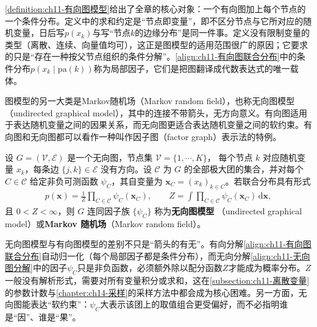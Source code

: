 \documentclass[../../main.tex]{subfiles}
\begin{document}
\begin{remark}
\cref{definition:ch11-有向图模型}给出了全章的核心对象：一个有向图加上每个节点的一个条件分布。定义中的求和约定是“节点即变量”，即不区分节点与它所对应的随机变量，日后写$p(x_k)$与写“节点$k$的边缘分布”是同一件事。定义没有限制变量的类型（离散、连续、向量值均可），这正是图模型的适用范围很广的原因；它要求的只是“存在一种按父节点组织的条件分解”。\eqref{align:ch11-有向图联合分布}中的条件分布$p(x_k\mid \mathrm{pa}(k))$称为局部因子，它们是把图翻译成代数表达式的唯一载体。
\end{remark}

图模型的另一大类是Markov随机场（Markov random field），也称无向图模型（undirected graphical model），其中的连接不带箭头，无方向意义。有向图适用于表达随机变量之间的因果关系，而无向图更适合表达随机变量之间的软约束。有向图和无向图都可以看作一种叫作因子图（factor graph）表示法的特例。

\begin{definition}[无向图模型]\label{definition:ch11-无向图模型}
设 $G=(\mathcal{V},\mathcal{E})$ 是一个无向图，节点集 $\mathcal{V}=\{1,\cdots,K\}$，
每个节点 $k$ 对应随机变量 $x_k$，每条边 $\{j,k\}\in\mathcal{E}$ 没有方向。设
$\mathcal{C}$ 为 $G$ 的全部极大团的集合，并对每个 $C\in\mathcal{C}$ 给定非负可测函数
$\psi_C$，其自变量为 $\mathbf{x}_C=(x_k)_{k\in C}$。若联合分布具有形式
\begin{align}
  p(\mathbf{x}) = \frac{1}{Z}\prod_{C\in\mathcal{C}}\psi_C(\mathbf{x}_C),\qquad
  Z=\int\prod_{C\in\mathcal{C}}\psi_C(\mathbf{x}_C)\,\mathrm{d}\mathbf{x},
  \label{align:ch11-无向图分解}
\end{align}
且 $0<Z<\infty$，则 $G$ 连同因子族 $\{\psi_C\}$ 称为\textbf{无向图模型}
（undirected graphical model）或\textbf{Markov 随机场}（Markov random field）。
\end{definition}

\begin{remark}
无向图模型与有向图模型的差别不只是“箭头的有无”。有向分解\eqref{align:ch11-有向图联合分布}自动归一化（每个局部因子都是条件分布），而无向分解\eqref{align:ch11-无向图分解}中的因子$\psi_C$只是非负函数，必须额外除以配分函数$Z$才能成为概率分布。$Z$一般没有解析形式，需要对所有变量积分或求和，这在\cref{subsection:ch11-离散变量}的参数计数与\cref{chapter:ch14-采样}的采样方法中都会成为核心困难。另一方面，无向图能表达“软约束”：$\psi_C$大表示该团上的取值组合更受偏好，而不必指明谁是“因”、谁是“果”。
\end{remark}
\end{document}
